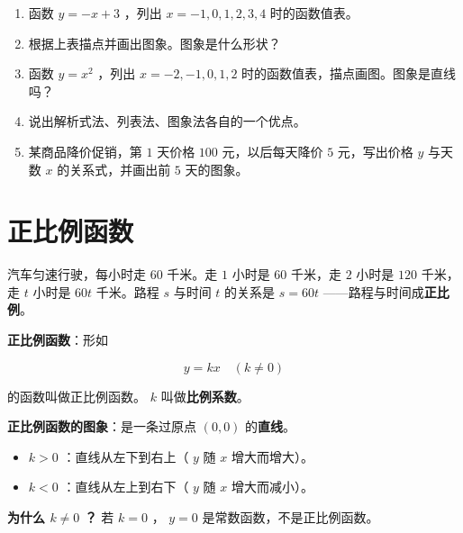 \begin{practice}


\begin{enumerate}
  \item 函数 $y = -x + 3$ ，列出 $x = -1, 0, 1, 2, 3, 4$ 时的函数值表。
  \item 根据上表描点并画出图象。图象是什么形状？
  \item 函数 $y = x^2$ ，列出 $x = -2, -1, 0, 1, 2$ 时的函数值表，描点画图。图象是直线吗？
  \item 说出解析式法、列表法、图象法各自的一个优点。
  \item 某商品降价促销，第 $1$ 天价格 $100$ 元，以后每天降价 $5$ 元，写出价格 $y$ 与天数 $x$ 的关系式，并画出前 $5$ 天的图象。
\end{enumerate}


\end{practice}

\section*{正比例函数}


\begin{explore}


汽车匀速行驶，每小时走 $60$ 千米。走 $1$ 小时是 $60$ 千米，走 $2$ 小时是 $120$ 千米，走 $t$ 小时是 $60t$ 千米。路程 $s$ 与时间 $t$ 的关系是 $s = 60t$ ——路程与时间成\textbf{正比例}。

\end{explore}

\begin{understand}


\textbf{正比例函数}：形如

\[
y = kx \quad (k \neq 0)
\]


的函数叫做正比例函数。 $k$ 叫做\textbf{比例系数}。

\textbf{正比例函数的图象}：是一条过原点 $(0, 0)$ 的\textbf{直线}。

\begin{itemize}
  \item $k > 0$ ：直线从左下到右上（ $y$ 随 $x$ 增大而增大）。
  \item $k < 0$ ：直线从左上到右下（ $y$ 随 $x$ 增大而减小）。
\end{itemize}


\textbf{为什么 $k \neq 0$ ？} 若 $k = 0$ ， $y = 0$ 是常数函数，不是正比例函数。

\end{understand}

